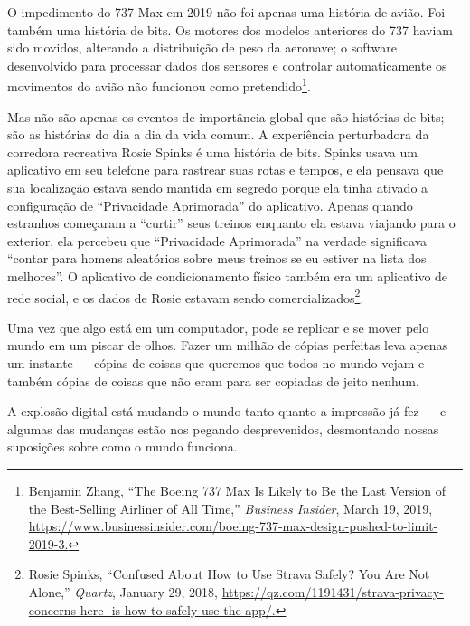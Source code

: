 O impedimento do 737 Max em 2019 não foi apenas uma história de avião. Foi 
também uma história de bits. Os motores dos modelos anteriores do 737 haviam 
sido movidos, alterando a distribuição de peso da aeronave; o software 
desenvolvido para processar dados dos sensores e controlar automaticamente os 
movimentos do avião não funcionou como pretendido\footnote{Benjamin Zhang, ``The
Boeing 737 Max Is Likely to Be the Last Version of the Best-Selling Airliner of
All Time,'' \textit{Business Insider}, March 19, 2019, \url{https://www.businessinsider.com/boeing-737-max-design-pushed-to-limit-2019-3.}}.

Mas não são apenas os eventos de importância global que são histórias de bits; 
são as histórias do dia a dia da vida comum. A experiência perturbadora da 
corredora recreativa Rosie Spinks é uma história de bits. Spinks usava um 
aplicativo em seu telefone para rastrear suas rotas e tempos, e ela pensava que 
sua localização estava sendo mantida em segredo porque ela tinha ativado a 
configuração de ``Privacidade Aprimorada'' do aplicativo. Apenas quando
estranhos começaram a ``curtir'' seus treinos enquanto ela estava viajando para
o exterior, ela percebeu que ``Privacidade Aprimorada'' na verdade significava
``contar para homens aleatórios sobre meus treinos se eu estiver na lista dos
melhores''. O aplicativo de condicionamento físico também era um aplicativo de
rede social, e os dados de Rosie estavam sendo comercializados\footnote{Rosie
Spinks, ``Confused About How to Use Strava Safely? You Are Not Alone,''
\textit{Quartz}, January 29, 2018, \url{https://qz.com/1191431/strava-privacy-concerns-here-
is-how-to-safely-use-the-app/.}}.

Uma vez que algo está em um computador, pode se replicar e se mover pelo mundo 
em um piscar de olhos. Fazer um milhão de cópias perfeitas leva apenas um 
instante --- cópias de coisas que queremos que todos no mundo vejam e também 
cópias de coisas que não eram para ser copiadas de jeito nenhum.

A explosão digital está mudando o mundo tanto quanto a impressão já fez --- e 
algumas das mudanças estão nos pegando desprevenidos, desmontando nossas 
suposições sobre como o mundo funciona.

